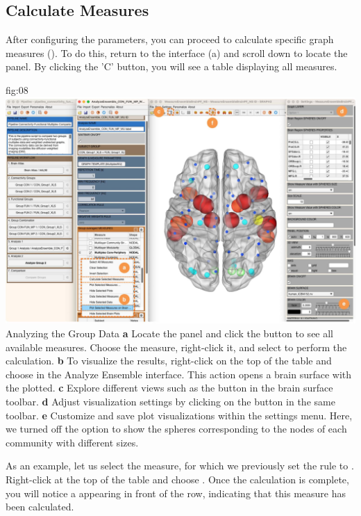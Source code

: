 \documentclass[justified]{tufte-handout}
\begin{document}
\clearpage
\subsection{Calculate Measures}
 
After configuring the parameters, you can proceed to calculate specific graph measures (). To do this, return to the  interface (a) and scroll down to locate the  panel. By clicking the 'C' button, you will see a table displaying all measures.

	{fig:08}
	{
	\includegraphics{fig08.jpg}
	}
	{Analyzing the Group Data}
	{
	{\bf a} Locate the  panel and click the  button to see all available measures. Choose the  measure, right-click it, and select  to perform the calculation.
	{\bf b} To visualize the results, right-click on the top of the table and choose  in the Analyze Ensemble interface. This action opens a brain surface with the  plotted.
	{\bf c} Explore different views such as the  button in the brain surface toolbar.
	{\bf d} Adjust visualization settings by clicking on the  button in the same toolbar.
	{\bf e} Customize and save plot visualizations within the settings menu. Here, we turned off the option to show the spheres corresponding to the nodes of each community with different sizes.
	}

As an example, let us select the  measure, for which we previously set the rule to . Right-click at the top of the table and choose . Once the calculation is complete, you will notice a  appearing in front of the  row, indicating that this measure has been calculated.
\end{document}
